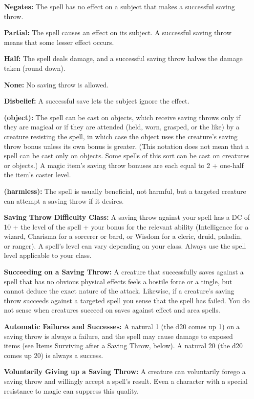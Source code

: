\documentclass{article}
\begin{document}
\textbf{Negates: }The spell has no effect on a subject that makes a successful 
saving throw.

\textbf{Partial:} The spell causes an effect on its subject. A successful saving 
throw means that some lesser effect occurs.

\textbf{Half:} The spell deals damage, and a successful saving throw halves the 
damage taken (round down).

\textbf{None:} No saving throw is allowed.

\textbf{Disbelief:} A successful save lets the subject ignore the effect. 

\textbf{(object):} The spell can be cast on objects, which receive saving throws 
only if they are magical or if they are attended (held, worn, grasped, or the like) 
by a creature resisting the spell, in which case the object uses the creature's 
saving throw bonus unless its own bonus is greater. (This notation does not mean 
that a spell can be cast only on objects. Some spells of this sort can be cast 
on creatures or objects.) A magic item's saving throw bonuses are each equal to 
2 + one-half the item's caster level. 

\textbf{(harmless):} The spell is usually beneficial, not harmful, but a targeted 
creature can attempt a saving throw if it desires.

\textbf{Saving Throw Difficulty Class:} A saving throw against your spell has a 
DC of 10 + the level of the spell + your bonus for the relevant ability (Intelligence 
for a wizard, Charisma for a sorcerer or bard, or Wisdom for a cleric, druid, paladin, 
or ranger). A spell's level can vary depending on your class. Always use the spell 
level applicable to your class.

\textbf{Succeeding on a Saving Throw: }A creature that successfully saves against 
a spell that has no obvious physical effects feels a hostile force or a tingle, 
but cannot deduce the exact nature of the attack. Likewise, if a creature's saving 
throw succeeds against a targeted spell you sense that the spell has failed. You 
do not sense when creatures succeed on saves against effect and area spells.

\textbf{Automatic Failures and Successes:} A natural 1 (the d20 comes up 1) on 
a saving throw is always a failure, and the spell may cause damage to exposed items 
(see Items Surviving after a Saving Throw, below). A natural 20 (the d20 comes 
up 20) is always a success.

\textbf{Voluntarily Giving up a Saving Throw:} A creature can voluntarily forego 
a saving throw and willingly accept a spell's result. Even a character with a special 
resistance to magic can suppress this quality.
\end{document}
